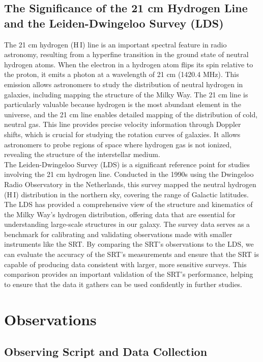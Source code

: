 \documentclass[linenumbers,twocolumn]{aastex631}
\newcommand{\hi}{{\rm H\,{\small I}}}
\begin{document}
\subsection{The Significance of the 21 cm Hydrogen Line and the Leiden-Dwingeloo Survey (LDS)}

The 21 cm hydrogen (\hi) line is an important spectral feature in radio astronomy, resulting from a hyperfine transition in the ground state of neutral hydrogen atoms. When the electron in a hydrogen atom flips its spin relative to the proton, it emits a photon at a wavelength of 21 cm (1420.4 MHz). This emission allows astronomers to study the distribution of neutral hydrogen in galaxies, including mapping the structure of the Milky Way. The 21 cm line is particularly valuable because hydrogen is the most abundant element in the universe, and the 21 cm line enables detailed mapping of the distribution of cold, neutral gas. This line provides precise velocity information through Doppler shifts, which is crucial for studying the rotation curves of galaxies. It allows astronomers to probe regions of space where hydrogen gas is not ionized, revealing the structure of the interstellar medium. \\

The Leiden-Dwingeloo Survey (LDS) is a significant reference point for studies involving the 21 cm hydrogen line. Conducted in the 1990s using the Dwingeloo Radio Observatory in the Netherlands, this survey mapped the neutral hydrogen (\hi) distribution in the northern sky, covering the range of Galactic latitudes. The LDS has provided a comprehensive view of the structure and kinematics of the Milky Way's hydrogen distribution, offering data that are essential for understanding large-scale structures in our galaxy. The survey data serves as a benchmark for calibrating and validating observations made with smaller instruments like the SRT. By comparing the SRT’s observations to the LDS, we can evaluate the accuracy of the SRT's measurements and ensure that the SRT is capable of producing data consistent with larger, more sensitive surveys. This comparison provides an important validation of the SRT's performance, helping to ensure that the data it gathers can be used confidently in further studies.

\section{Observations} \label{sec:observations}

\subsection{Observing Script and Data Collection}
\end{document}
